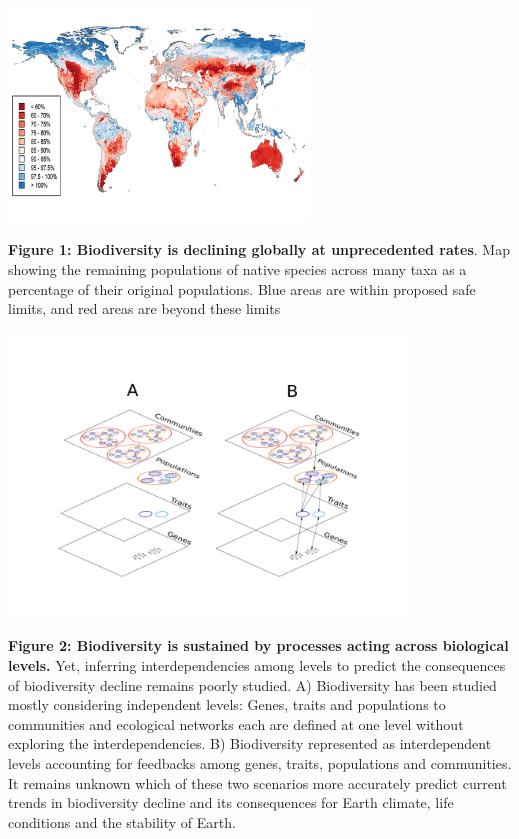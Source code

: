 \documentclass[11pt]{article}
\begin{document}
\begin{mybox}
  \begin{center}
       \includegraphics[width=0.6\textwidth]{Figure1.png}
     \end{center}
             \vspace{-0.45 in}

     \caption{{\small {\bf Figure 1: Biodiversity is declining globally at unprecedented
         rates}. Map showing the remaining populations of native
       species across many taxa as a percentage of their original
       populations. Blue areas are within proposed safe limits, and
       red areas are beyond these limits \citep{Newboldetal:2016}}}
   \vspace{-0.75 in}
     
\begin{center}
     \includegraphics[width=0.8\textwidth]{Figure2.pdf}
   \end{center}
        \vspace{-0.65 in}
        \caption{{\small {\bf Figure 2: Biodiversity is sustained by
              processes acting across biological levels.} Yet,
            inferring interdependencies among levels to predict the
            consequences of biodiversity decline remains poorly
            studied. A) Biodiversity has been studied mostly
            considering independent levels: Genes, traits and
            populations to communities and ecological networks each
            are defined at one level without exploring the
            interdependencies. B) Biodiversity represented as
            interdependent levels accounting for feedbacks among
            genes, traits, populations and communities. It remains
            unknown which of these two scenarios more accurately
            predict current trends in biodiversity decline and its
            consequences for Earth climate, life conditions and the
            stability of Earth.}}
\end{mybox}
\end{document}
